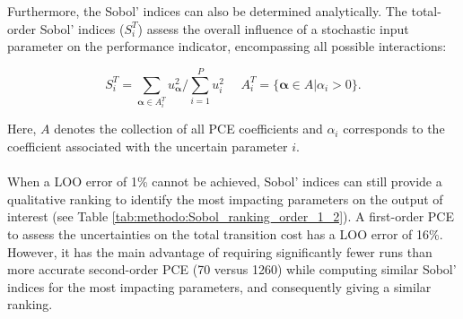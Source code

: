 Furthermore, the Sobol' indices can also be determined analytically. The total-order Sobol' indices ($S_i^{T}$) assess the overall influence of a stochastic input parameter on the performance indicator, encompassing all possible interactions:

\begin{equation}
S_i^{T} = \sum_{\bm{\alpha} \in A_i^T}^{} u_{\bm{\alpha}}^2/\sum_{i=1}^P u_i^2 ~~~~~~ A_i^T = \{\bm{\alpha} \in A | \alpha_i > 0\}.
\end{equation}

Here, $A$ denotes the collection of all PCE coefficients and $\alpha_i$ corresponds to the coefficient associated with the uncertain parameter $i$.\\

\\

When a \gls{LOO} error of 1\% cannot be achieved, Sobol' indices can still provide a qualitative ranking to identify the most impacting parameters on the output of interest (see Table \ref{tab:methodo:Sobol_ranking_order_1_2}). A first-order \gls{PCE} to assess the uncertainties on the total transition cost has a \gls{LOO} error of 16\%. However, it has the main advantage of requiring significantly fewer runs than more accurate second-order \gls{PCE} (70 versus 1260) while computing similar Sobol' indices for the most impacting parameters, and consequently giving a similar ranking.

\begin{table}[htbp!]
\caption{Total Sobol' indices of the uncertain parameters over the total transition cost via \gls{PCE} of orders 2 and 1 having a \gls{LOO} error of 1\% and 16\%, respectively. The similar rankings (and indices) show the validity of using the faster (even though less accurate) lower-order \gls{PCE} to rank the most impacting uncertain parameters.}
\label{tab:methodo:Sobol_ranking_order_1_2}
\begin{minipage}{\textwidth}
\centering
{}
\end{minipage}
\end{table}

